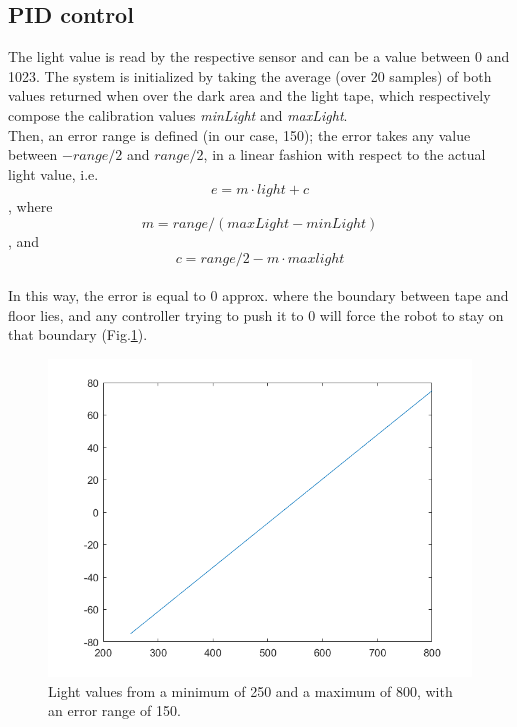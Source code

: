 \documentclass[a4paper,11pt,oneside]{book}
\begin{document}
		\subsection{PID control}
		The light value is read by the respective sensor and can be a value between 0 and 1023.
		The system is initialized by taking the average (over 20 samples) of both values returned when over the dark area and the light tape, which respectively compose the calibration values \emph{minLight} and \emph{maxLight}.\\
		Then, an error range is defined (in our case, 150); the error takes any value between $-range/2$ and $range/2$, in a linear fashion with respect to the actual light value, i.e. $$e=m\cdot \mathit{light}+c$$, where $$m=\mathit{range}/(\mathit{maxLight-minLight})$$, and $$c=\mathit{range}/2-m\cdot \mathit{maxlight}$$\\
		In this way, the error is equal to 0 approx. where the boundary between tape and floor lies, and any controller trying to push it to 0 will force the robot to stay on that boundary (Fig.\ref{fig:lightError.png}).\\
		\begin{figure} [H]
			\centering
			\includegraphics[scale=0.45]{figs/lightError.png}
			\caption{Light values from a minimum of 250 and a maximum of 800, with an error range of 150.}\label{fig:lightError.png}
		\end{figure}
		
\end{document}
